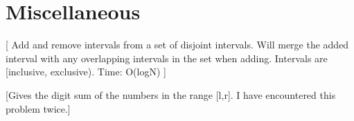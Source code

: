 \chapter{Miscellaneous}

[
    Add and remove intervals from a set of disjoint intervals. Will merge the added interval with 
    any overlapping intervals in the set when adding. Intervals are {[inclusive, exclusive)}. Time: O(logN)
]







[Gives the digit sum of the numbers in the range [l,r]. I have encountered this problem twice.]